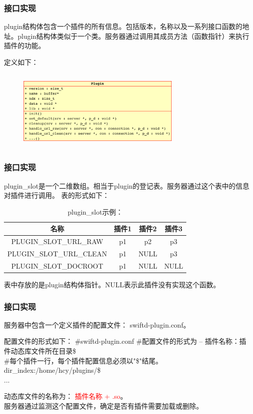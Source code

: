 \documentclass[10pt,dvipdfm]{beamer}
\begin{document}
\begin{frame}
	\frametitle{接口实现}
	plugin结构体包含一个插件的所有信息。包括版本，名称以及一系列接口函数的地址。plugin结构体类似于一个类。服务器通过调用其成员方法（函数指针）来执行插件的功能。
	
	定义如下：
	\begin{figure}[htbp]
	\centering
	\includegraphics[height=4cm, width=8cm]{pics/plugin_s.eps}
	\end{figure}
\end{frame}

\begin{frame}
	\frametitle{接口实现}
	plugin\_slot是一个二维数组。相当于plugin的登记表。服务器通过这个表中的信息对插件进行调用。
	表的形式如下：
	\begin{table}[htbp]
	\caption{plugin\_slot示例：}
	\centering
	\begin{tabular}{cccc} %
	\toprule
	\centering 名称 & 插件1 & 插件2 &插件3\\
	\midrule
	\centering PLUGIN\_SLOT\_URL\_RAW & p1 &  p2 & p3\\
	\centering PLUGIN\_SLOT\_URL\_CLEAN &  p1 &  NULL & p3\\
	\centering PLUGIN\_SLOT\_DOCROOT & p1 & NULL & NULL\\
	\bottomrule
	\end{tabular}
	\end{table}
	\begin{block}{}
		表中存放的是plugin结构体指针。NULL表示此插件没有实现这个函数。
	\end{block}
\end{frame}

\begin{frame}
	\frametitle{接口实现}
	服务器中包含一个定义插件的配置文件： swiftd-plugin.conf。
	
	\begin{block}{配置文件的形式如下：}	
		\#swiftd-plugin.conf
		\#配置文件的形式为  -- 插件名称：插件动态库文件所在目录\$\\
		\#每个插件一行，每个插件配置信息必须以"\$"结尾。\\
		dir\_index:/home/hcy/plugins/\$\\
		...
	\end{block}
	
	\pause
	
	\begin{block}{}
	动态库文件的名称为： \textcolor{red}{插件名称 + .so}。\\
	服务器通过监测这个配置文件，确定是否有插件需要加载或删除。
	\end{block}
\end{frame}
\end{document}
